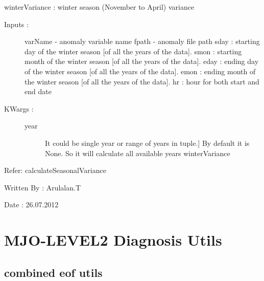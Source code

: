 \documentclass[letterpaper,10pt,english]{sphinxmanual}
\begin{document}
\begin{fulllineitems}
\label{mjo:variance_utils.winterVariance}
winterVariance : winter season (November to April) variance
\begin{description}
\item[{Inputs :}] \leavevmode
varName - anomaly variable name
fpath - anomaly file path
sday : starting day of the winter season {[}of all the years of the data{]}.
smon : starting month of the winter season {[}of all the years of the data{]}.
eday : ending day of the winter season {[}of all the years of the data{]}.
emon : ending month of the winter season {[}of all the years of the data{]}.
hr : hour for both start and end date

\item[{KWargs :}] \leavevmode\begin{description}
\item[{year}] \leavevmode{[}It could be single year or range of years in tuple.{]}
By default it is None. So it will calculate all available years
winterVariance

\end{description}

\end{description}

Refer: calculateSeasonalVariance

Written By : Arulalan.T

Date : 26.07.2012

\end{fulllineitems}



\section{MJO-LEVEL2 Diagnosis Utils}
\label{mjo:mjo-level2-diagnosis-utils}

\subsection{combined eof utils}
\label{mjo:module-ceof_diag}\label{mjo:combined-eof-utils}
\end{document}
